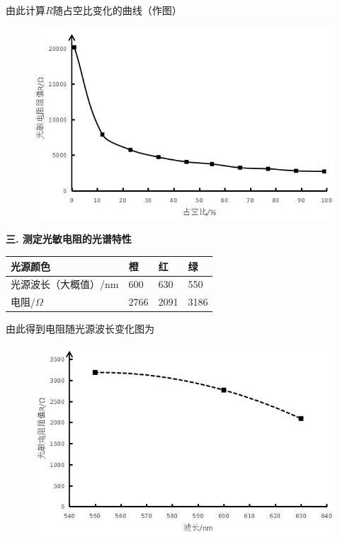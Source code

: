 \documentclass[dvipsnames, svgnames,a4paper,11pt]{article}
\begin{document}
由此计算$R$随占空比变化的曲线（作图）
\begin{figure}[H]
	\includegraphics*[width=\textwidth]{R占空比.png}
\end{figure}
\textbf{三. 测定光敏电阻的光谱特性}\\
\begin{table}[H]
	\renewcommand\arraystretch{1.7}
	\centering
	\begin{tabularx}{\textwidth}{|X|X|X|X|}
	\hline
	光源颜色&橙&红&绿\\
	\hline
	光源波长（大概值）/nm&600&630&550\\
	\hline
	电阻/$\Omega$&2766&2091&3186  \\
	\hline
	\end{tabularx}
\end{table}
由此得到电阻随光源波长变化图为
\begin{figure}[H]
	\includegraphics*[width=\textwidth]{电阻随波长.png}
\end{figure}
\end{document}
